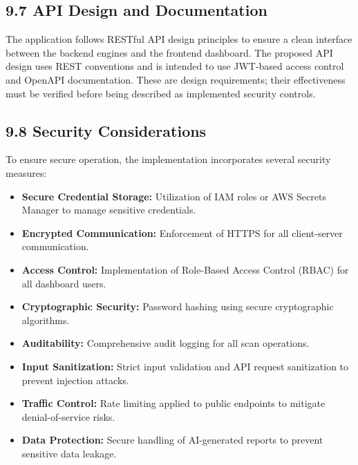 \subsection{9.7 API Design and Documentation}

The application follows RESTful API design principles to ensure a clean interface between the backend engines and the frontend dashboard. The proposed API design uses REST conventions and is intended to use JWT-based access control and OpenAPI documentation. These are design requirements; their effectiveness must be verified before being described as implemented security controls.

\subsection{9.8 Security Considerations}

To ensure secure operation, the implementation incorporates several security measures:

\begin{itemize}
\tightlist
\item
  \textbf{Secure Credential Storage:} Utilization of IAM roles or AWS Secrets Manager to manage sensitive credentials.\\
\item
  \textbf{Encrypted Communication:} Enforcement of HTTPS for all client-server communication.\\
\item
  \textbf{Access Control:} Implementation of Role-Based Access Control (RBAC) for all dashboard users.\\
\item
  \textbf{Cryptographic Security:} Password hashing using secure cryptographic algorithms.\\
\item
  \textbf{Auditability:} Comprehensive audit logging for all scan operations.\\
\item
  \textbf{Input Sanitization:} Strict input validation and API request sanitization to prevent injection attacks.\\
\item
  \textbf{Traffic Control:} Rate limiting applied to public endpoints to mitigate denial-of-service risks.\\
\item
  \textbf{Data Protection:} Secure handling of AI-generated reports to prevent sensitive data leakage.
\end{itemize}

